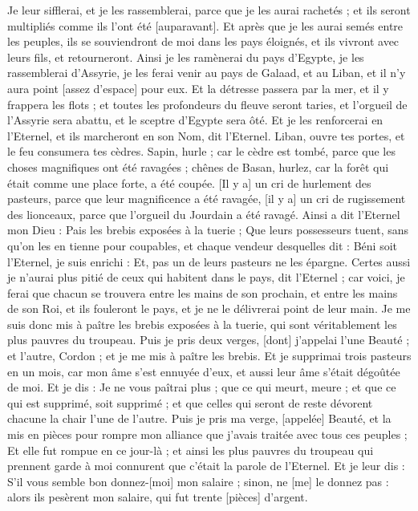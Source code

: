 \begin{multicols}{2}
Je leur sifflerai, et je les rassemblerai, parce que je les aurai rachetés ; et ils seront multipliés comme ils l'ont été [auparavant].
Et après que je les aurai semés entre les peuples, ils se souviendront de moi dans les pays éloignés, et ils vivront avec leurs fils, et retourneront.
Ainsi je les ramènerai du pays d'Egypte, je les rassemblerai d'Assyrie, je les ferai venir au pays de Galaad, et au Liban, et il n'y aura point [assez d'espace] pour eux.
Et la détresse passera par la mer, et il y frappera les flots ; et toutes les profondeurs du fleuve seront taries, et l'orgueil de l'Assyrie sera abattu, et le sceptre d'Egypte sera ôté.
Et je les renforcerai en l'Eternel, et ils marcheront en son Nom, dit l'Eternel.
\VerseOne{}Liban, ouvre tes portes, et le feu consumera tes cèdres.
Sapin, hurle ; car le cèdre est tombé, parce que les choses magnifiques ont été ravagées ; chênes de Basan, hurlez, car la forêt qui était comme une place forte, a été coupée.
[Il y a] un cri de hurlement des pasteurs, parce que leur magnificence a été ravagée, [il y a] un cri de rugissement des lionceaux, parce que l'orgueil du Jourdain a été ravagé.
Ainsi a dit l'Eternel mon Dieu : Pais les brebis exposées à la tuerie ;
Que leurs possesseurs tuent, sans qu'on les en tienne pour coupables, et chaque vendeur desquelles dit : Béni soit l'Eternel, je suis enrichi : Et, pas un de leurs pasteurs ne les épargne.
Certes aussi je n'aurai plus pitié de ceux qui habitent dans le pays, dit l'Eternel ; car voici, je ferai que chacun se trouvera entre les mains de son prochain, et entre les mains de son Roi, et ils fouleront le pays, et je ne le délivrerai point de leur main.
Je me suis donc mis à paître les brebis exposées à la tuerie, qui sont véritablement les plus pauvres du troupeau. Puis je pris deux verges, [dont] j'appelai l'une Beauté ; et l'autre, Cordon ; et je me mis à paître les brebis.
Et je supprimai trois pasteurs en un mois, car mon âme s'est ennuyée d'eux, et aussi leur âme s'était dégoûtée de moi.
Et je dis : Je ne vous paîtrai plus ; que ce qui meurt, meure ; et que ce qui est supprimé, soit supprimé ; et que celles qui seront de reste dévorent chacune la chair l'une de l'autre.
Puis je pris ma verge, [appelée] Beauté, et la mis en pièces pour rompre mon alliance que j'avais traitée avec tous ces peuples ;
Et elle fut rompue en ce jour-là ; et ainsi les plus pauvres du troupeau qui prennent garde à moi connurent que c'était la parole de l'Eternel.
Et je leur dis : S'il vous semble bon donnez-[moi] mon salaire ; sinon, ne [me] le donnez pas : alors ils pesèrent mon salaire, qui fut trente [pièces] d'argent.

\end{multicols}
